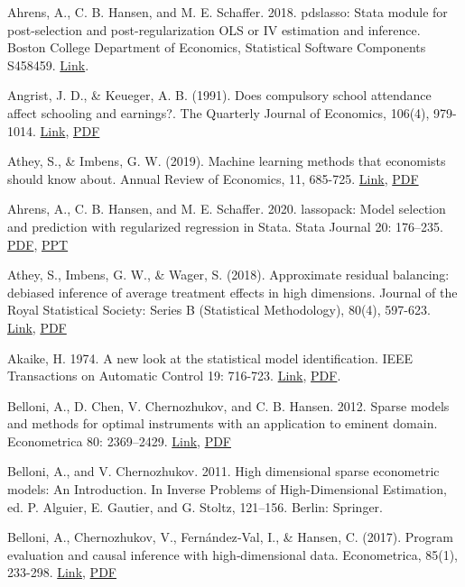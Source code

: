 {Ahrens, A., C. B. Hansen, and M. E. Schaffer. 2018. pdslasso: Stata module for post-selection and post-regularization
OLS or IV estimation and inference. Boston College Department of Economics, Statistical Software Components
S458459. \href{https://ideas.repec.org/c/boc/bocode/s458459.html}{Link}.

Angrist, J. D., \& Keueger, A. B. (1991). Does compulsory school attendance affect schooling and earnings?. The Quarterly Journal of Economics, 106(4), 979-1014. \href{https://doi.org/10.2307/2937954}{Link}, \href{http://sci-hub.ren/10.2307/2937954}{PDF}

Athey, S., \& Imbens, G. W. (2019). Machine learning methods that economists should know about. Annual Review of Economics, 11, 685-725. \href{https://doi.org/10.1146/annurev-economics-080217-053433}{Link}, \href{http://sci-hub.ren/10.1146/annurev-economics-080217-053433}{PDF}

Ahrens, A., C. B. Hansen, and M. E. Schaffer. 2020. lassopack: Model selection and prediction with regularized regression in Stata. Stata Journal 20: 176–235. \href{http://sci-hub.ren/10.1177/1536867X20909697}{PDF}, \href{https://statalasso.github.io/pdf/StataConference2018_AhrensSchaffer.pdf}{PPT}

Athey, S., Imbens, G. W., \& Wager, S. (2018). Approximate residual balancing: debiased inference of average treatment effects in high dimensions. Journal of the Royal Statistical Society: Series B (Statistical Methodology), 80(4), 597-623. \href{https://doi.org/10.1111/rssb.12268}{Link}, \href{http://sci-hub.ren/10.1111/rssb.12268}{PDF}         

Akaike, H. 1974. A new look at the statistical model identification.  IEEE Transactions on Automatic Control 19: 716-723. \href{https://doi.org/10.1109/TAC.1974.1100705}{Link}, \href{http://sci-hub.ren/10.1109/TAC.1974.1100705}{PDF}.

Belloni, A., D. Chen, V. Chernozhukov, and C. B. Hansen. 2012. Sparse models and methods for optimal instruments
with an application to eminent domain. Econometrica 80: 2369–2429. \href{https://doi.org/10.3982/ECTA9626}{Link}, \href{http://sci-hub.ren/10.3982/ECTA9626}{PDF} %

Belloni, A., and V. Chernozhukov. 2011. High dimensional sparse econometric models: An Introduction. In Inverse
Problems of High-Dimensional Estimation, ed. P. Alguier, E. Gautier, and G. Stoltz, 121–156. Berlin: Springer.


Belloni, A., Chernozhukov, V., Fernández‐Val, I., \& Hansen, C. (2017). Program evaluation and causal inference with high‐dimensional data. Econometrica, 85(1), 233-298. \href{https://doi.org/10.3982/ECTA12723}{Link}, \href{http://sci-hub.ren/10.3982/ECTA12723}{PDF}

}
